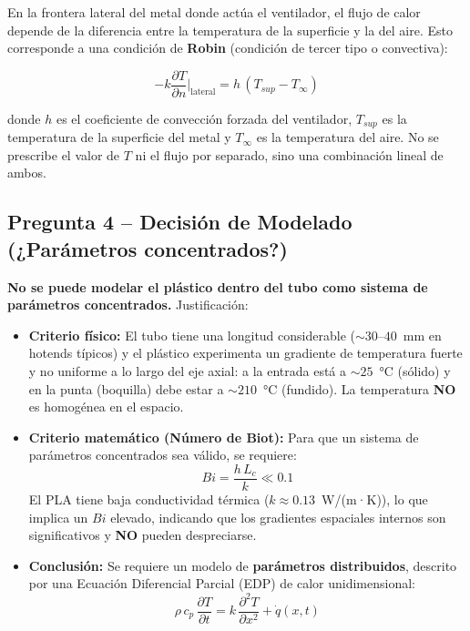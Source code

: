 \documentclass[12pt,a4paper]{article}
\begin{document}
En la frontera lateral del metal donde actúa el ventilador, el flujo de calor depende de la
diferencia entre la temperatura de la superficie y la del aire. Esto corresponde a una condición
de \textbf{Robin} (condición de tercer tipo o convectiva):

\begin{equation}
    -k \frac{\partial T}{\partial n}\bigg|_{\text{lateral}} = h\,(T_{sup} - T_{\infty})
\end{equation}

\noindent donde $h$ es el coeficiente de convección forzada del ventilador, $T_{sup}$ es la
temperatura de la superficie del metal y $T_{\infty}$ es la temperatura del aire. No se prescribe
el valor de $T$ ni el flujo por separado, sino una combinación lineal de ambos.

\subsection*{Pregunta 4 -- Decisión de Modelado (¿Parámetros concentrados?)}

\noindent\textbf{No se puede modelar el plástico dentro del tubo como sistema de parámetros
concentrados.} Justificación:

\begin{itemize}
    \item \textbf{Criterio físico:} El tubo tiene una longitud considerable (${\sim}30$--$40$~mm en
          hotends típicos) y el plástico experimenta un gradiente de temperatura fuerte y no uniforme
          a lo largo del eje axial: a la entrada está a ${\sim}25$~°C (sólido) y en la punta
          (boquilla) debe estar a ${\sim}210$~°C (fundido). La temperatura \textbf{NO} es homogénea
          en el espacio.

    \item \textbf{Criterio matemático (Número de Biot):} Para que un sistema de parámetros
          concentrados sea válido, se requiere:
          \begin{equation}
              Bi = \frac{h\,L_c}{k} \ll 0.1
          \end{equation}
          El PLA tiene baja conductividad térmica ($k \approx 0.13$~W/(m·K)), lo que implica un
          $Bi$ elevado, indicando que los gradientes espaciales internos son significativos y
          \textbf{NO} pueden despreciarse.

    \item \textbf{Conclusión:} Se requiere un modelo de \textbf{parámetros distribuidos}, descrito
          por una Ecuación Diferencial Parcial (EDP) de calor unidimensional:
          \begin{equation}
              \rho\,c_p\,\frac{\partial T}{\partial t} = k\,\frac{\partial^2 T}{\partial x^2}
              + \dot{q}(x,t)
          \end{equation}
\end{itemize}
\end{document}
